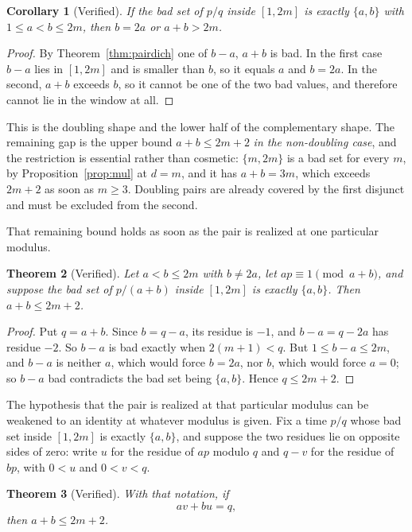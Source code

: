 \documentclass[11pt]{amsart}
\theoremstyle{plain}
\newtheorem{theorem}{Theorem}[section]
\newtheorem{corollary}[theorem]{Corollary}
\theoremstyle{definition}
\begin{document}
\begin{corollary}[Verified]\label{cor:pairstruct}
If the bad set of $p/q$ inside $[1,2m]$ is exactly $\{a,b\}$ with $1 \le a < b \le 2m$, then
$b = 2a$ or $a + b > 2m$.
\end{corollary}

\begin{proof}
By Theorem~\ref{thm:pairdich} one of $b-a$, $a+b$ is bad. In the first case $b-a$ lies in $[1,2m]$
and is smaller than $b$, so it equals $a$ and $b = 2a$. In the second, $a+b$ exceeds $b$, so it
cannot be one of the two bad values, and therefore cannot lie in the window at all.
\end{proof}

This is the doubling shape and the lower half of the complementary shape. The remaining gap is the
upper bound $a+b \le 2m+2$ \emph{in the non-doubling case}, and the restriction is essential rather
than cosmetic: $\{m,2m\}$ is a bad set for every $m$, by Proposition~\ref{prop:mul} at $d = m$, and
it has $a+b = 3m$, which exceeds $2m+2$ as soon as $m \ge 3$. Doubling pairs are already covered by
the first disjunct and must be excluded from the second.

That remaining bound holds as soon as the pair is realized at one particular modulus.

\begin{theorem}[Verified]\label{thm:pairupper}
Let $a < b \le 2m$ with $b \ne 2a$, let $ap \equiv 1 \pmod{a+b}$, and suppose the bad set of
$p/(a+b)$ inside $[1,2m]$ is exactly $\{a,b\}$. Then $a + b \le 2m+2$.
\end{theorem}

\begin{proof}
Put $q = a+b$. Since $b = q - a$, its residue is $-1$, and $b - a = q - 2a$ has residue $-2$. So
$b-a$ is bad exactly when $2(m+1) < q$. But $1 \le b - a \le 2m$, and $b - a$ is neither $a$, which
would force $b = 2a$, nor $b$, which would force $a = 0$; so $b-a$ bad contradicts the bad set being
$\{a,b\}$. Hence $q \le 2m+2$.
\end{proof}

The hypothesis that the pair is realized at that particular modulus can be weakened to an identity
at whatever modulus is given. Fix a time $p/q$ whose bad set inside $[1,2m]$ is exactly $\{a,b\}$,
and suppose the two residues lie on opposite sides of zero: write $u$ for the residue of $ap$ modulo
$q$ and $q - v$ for the residue of $bp$, with $0 < u$ and $0 < v < q$.

\begin{theorem}[Verified]\label{thm:pairident}
With that notation, if
\[
  av + bu = q,
\]
then $a + b \le 2m+2$.
\end{theorem}
\end{document}
